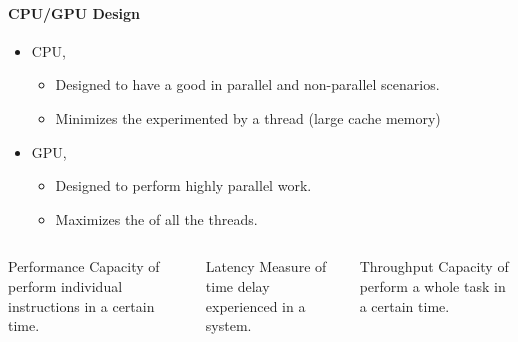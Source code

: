 \begin{frame}
    \framesubtitle{CPU/GPU Design}

    \begin{itemize}
        \item CPU,
        \begin{itemize}
            \item Designed to have a good 
                  in parallel and non-parallel scenarios.
            \item Minimizes the  experimented by a thread
                  (large cache memory)
        \end{itemize}
        \item GPU,
            \begin{itemize}
            \item Designed to perform highly parallel work.
            \item Maximizes the  of all the threads.
            \end{itemize}
    \end{itemize}

    \begin{footnotesize}
        \begin{columns}
            \begin{column}{0.35\textwidth}
            \begin{block}{Performance}
                Capacity of perform individual instructions in a certain time.
            \end{block}
            \end{column}
            \begin{column}{0.3\textwidth}
            \begin{block}{Latency}
                Measure of time delay experienced in a system.
            \end{block}
            \end{column}
            \begin{column}{0.3\textwidth}
            \begin{block}{Throughput}
                Capacity of perform a whole task in a certain time.
            \end{block}
            \end{column}
        \end{columns}
    \end{footnotesize}
\end{frame}

